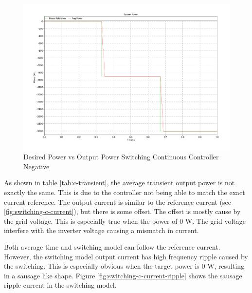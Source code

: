 \documentclass[12pt]{article}
\begin{document}
\begin{figure}[ht]
    \centering{}
    \includegraphics[width=\textwidth, height=0.4\textheight, keepaspectratio]{img/Switching C Power Negative.pdf}
    \caption{Desired Power vs Output Power Switching Continuous Controller Negative}
    \label{fig:switching-c-power-negative}
\end{figure}

As shown in table \ref{tab:c-transient}, the average transient output power is not exactly the same.
This is due to the controller not being able to match the exact current reference.
The output current is similar to the reference current (see \ref{fig:switching-c-current}), but there is some offset.
The offset is mostly cause by the grid voltage.
This is especially true when the power of 0 W.
The grid voltage interfere with the inverter voltage causing a mismatch in current.

Both average time and switching model can follow the reference current.
However, the switching model output current has high frequency ripple caused by the switching.
This is especially obvious when the target power is 0 W, resulting in a sausage like shape.
Figure \ref{fig:switching-c-current-ripple} shows the sausage ripple current in the switching model.
\end{document}
